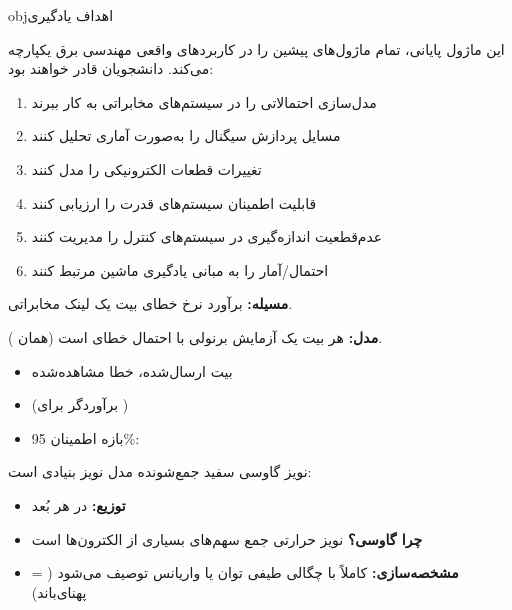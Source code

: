 \begin{PSbox}[unbreakable]{obj}{اهداف یادگیری}

این ماژول پایانی، تمام ماژول‌های پیشین را در کاربردهای واقعی مهندسی برق یکپارچه می‌کند. دانشجویان قادر خواهند بود:

\begin{enumerate}
\def\labelenumi{\arabic{enumi}.}
\tightlist
\item
  مدل‌سازی احتمالاتی را در سیستم‌های مخابراتی به کار ببرند
\item
  مسایل پردازش سیگنال را به‌صورت آماری تحلیل کنند
\item
  تغییرات قطعات الکترونیکی را مدل کنند
\item
  قابلیت اطمینان سیستم‌های قدرت را ارزیابی کنند
\item
  عدم‌قطعیت اندازه‌گیری در سیستم‌های کنترل را مدیریت کنند
\item
  احتمال/آمار را به مبانی یادگیری ماشین مرتبط کنند
\end{enumerate}

\end{PSbox}



\textbf{مسیله:} برآورد نرخ خطای بیت یک لینک مخابراتی.

\textbf{مدل:} هر بیت یک آزمایش برنولی با احتمال خطای  است (همان ).

\begin{itemize}
\tightlist
\item
   بیت ارسال‌شده،  خطا مشاهده‌شده
\item
   (برآوردگر  برای )
\item
  بازه اطمینان 95\%: 
\end{itemize}


نویز گاوسی سفید جمع‌شونده  مدل نویز بنیادی است:

\begin{itemize}
\tightlist
\item
  \textbf{توزیع:}  در هر بُعد
\item
  \textbf{چرا گاوسی؟}   نویز حرارتی جمع سهم‌های بسیاری از الکترون‌ها است
\item
  \textbf{مشخصه‌سازی:} کاملاً با چگالی طیفی توان  یا واریانس  توصیف می‌شود ( = پهنای‌باند)
\end{itemize}


